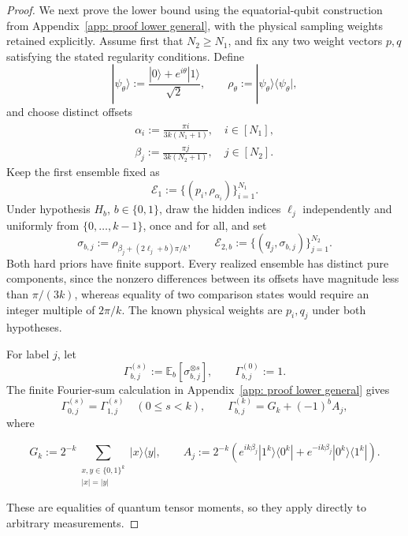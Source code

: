 \documentclass[aps,prx,reprint,superscriptaddress,amsmath,amssymb,longbibliography,floatfix]{revtex4-2}
\theoremstyle{plain}
\theoremstyle{definition}
\theoremstyle{remark}
\begin{document}
\begin{proof}
We next prove the lower bound using the equatorial-qubit construction from Appendix~\ref{app: proof lower general}, with the physical sampling weights retained explicitly. Assume first that \(N_2\ge N_1\), and fix any two weight vectors \(p,q\) satisfying the stated regularity conditions. Define
\[
    |\psi_\theta\rangle:=\frac{|0\rangle+e^{i\theta}|1\rangle}{\sqrt2},
    \qquad \rho_\theta:=|\psi_\theta\rangle\langle\psi_\theta|,
\]
and choose distinct offsets
\[
\begin{gathered}
\alpha_i:=\frac{\pi i}{3k(N_1+1)},\quad i\in[N_1],
    \\
    \beta_j:=\frac{\pi j}{3k(N_2+1)},\quad j\in[N_2].
\end{gathered}
\]
Keep the first ensemble fixed as
\begin{equation}
    \mathcal E_1:=\{(p_i,\rho_{\alpha_i})\}_{i=1}^{N_1}.
\label{eq:app-nonuniform-hard-reference-ensemble}
\end{equation}
Under hypothesis \(H_b\), \(b\in\{0,1\}\), draw the hidden indices \(\ell_j\) independently and uniformly from \(\{0,\ldots,k-1\}\), once and for all, and set
\begin{equation}
    \sigma_{b,j}:=\rho_{\beta_j+(2\ell_j+b)\pi/k},
    \qquad
    \mathcal E_{2,b}:=\{(q_j,\sigma_{b,j})\}_{j=1}^{N_2}.
\label{eq:app-nonuniform-hard-comparison-ensemble}
\end{equation}
Both hard priors have finite support. Every realized ensemble has distinct pure components, since the nonzero differences between its offsets have magnitude less than \(\pi/(3k)\), whereas equality of two comparison states would require an integer multiple of \(2\pi/k\). The known physical weights are \(p_i,q_j\) under both hypotheses.

For label \(j\), let
\[
    \Gamma_{b,j}^{(s)}:=\mathbb E_b[\sigma_{b,j}^{\otimes s}],
    \qquad \Gamma_{b,j}^{(0)}:=1.
\]
The finite Fourier-sum calculation in Appendix~\ref{app: proof lower general} gives
\begin{equation}
    \Gamma_{0,j}^{(s)}=\Gamma_{1,j}^{(s)}\quad(0\le s<k),
    \qquad
    \Gamma_{b,j}^{(k)}=G_k+(-1)^bA_j,
\label{eq:app-nonuniform-hard-tensor-moments}
\end{equation}
where
\begin{widetext}
\[
    G_k:=2^{-k}\!\sum_{\substack{x,y\in\{0,1\}^k\\|x|=|y|}}|x\rangle\langle y|,
    \qquad
    A_j:=2^{-k}\!\left(e^{ik\beta_j}|1^k\rangle\langle0^k|
                    +e^{-ik\beta_j}|0^k\rangle\langle1^k|\right).
\]
\end{widetext}
These are equalities of quantum tensor moments, so they apply directly to arbitrary measurements.


\end{proof}
\end{document}
